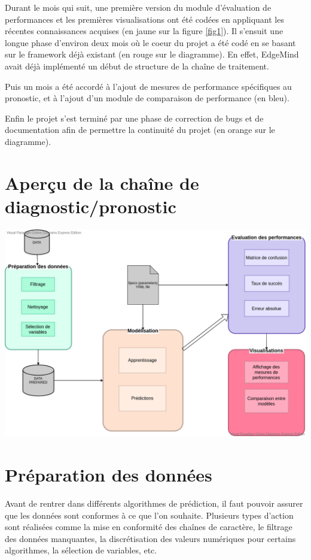 Durant le mois qui suit, une première version du module d’évaluation de performances et les premières visualisations ont été codées en appliquant les récentes connaissances acquises (en jaune sur la figure \ref{fig1}).
Il s’ensuit une longue phase d’environ deux mois où le coeur du projet a été codé en se basant sur le framework déjà existant (en rouge sur le diagramme). En effet, EdgeMind avait déjà implémenté un début de structure de la chaîne de traitement.

Puis un mois a été accordé à l’ajout de mesures de performance spécifiques au pronostic, et à l’ajout d’un module de comparaison de performance (en bleu).

Enfin le projet s’est terminé par une phase de correction de bugs et de documentation afin de permettre la continuité du projet (en orange sur le diagramme).

\section{Aperçu de la chaîne de diagnostic/pronostic}

\begin{center}
\includegraphics[scale=0.3]{figures/Bloc_diagram.png}
\label{fig2}
\end{center}

\section{Préparation des données}

Avant de rentrer dans différents algorithmes de prédiction, il faut pouvoir assurer que les données sont conformes à ce que l’on souhaite. Plusieurs types d’action sont réalisées comme la mise en conformité des chaînes de caractère, le filtrage des données manquantes, la discrétisation des valeurs numériques pour certains algorithmes, la sélection de variables, etc.

